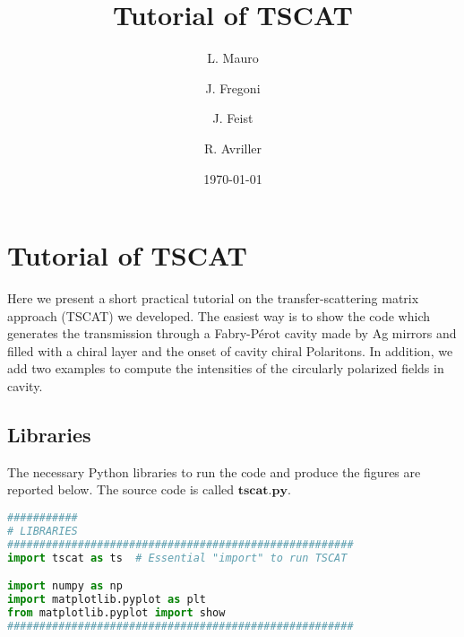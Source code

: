 \documentclass[aps,prl,10pt,onecolumn,superscriptaddress]{revtex4-2}
\begin{document}
\title{Tutorial of TSCAT}



\author{L. Mauro}
\author{J. Fregoni}
\author{J. Feist}
\author{R. Avriller}

\date{\today}

\maketitle
\section{Tutorial of TSCAT}
\label{tscatSec}
Here we present a short practical tutorial on the transfer-scattering matrix approach (TSCAT) we developed. The easiest way is to show the code which generates the transmission through a  Fabry-P\'erot cavity made by Ag mirrors and filled with a chiral layer and the onset of cavity chiral Polaritons. In addition, we add two examples to compute the intensities of the circularly polarized fields in cavity.
\subsection{Libraries}
The necessary Python libraries to run the code and produce the figures are reported below. The source code is called $\mathbf{tscat.py}$.
\begin{lstlisting}[language=Python, caption=Necessary Python libraries.]
###########
# LIBRARIES
######################################################
import tscat as ts  # Essential "import" to run TSCAT

import numpy as np
import matplotlib.pyplot as plt
from matplotlib.pyplot import show
######################################################
\end{lstlisting}
\end{document}
